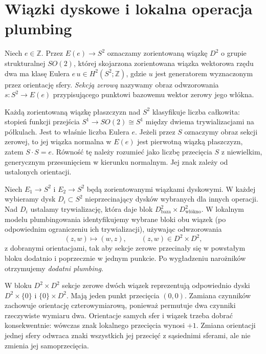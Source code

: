 \section{Wiązki dyskowe i lokalna operacja plumbing}
\label{sec:tg-plumbing-definition}

\begin{definicja}
Niech $e\in\mathbb Z$. Przez $E(e)\to S^2$ oznaczamy zorientowaną
wiązkę $D^2$ o grupie strukturalnej $SO(2)$, której skojarzona
zorientowana wiązka wektorowa rzędu dwa ma klasę Eulera
$e\,u\in H^2(S^2;\mathbb Z)$, gdzie $u$ jest generatorem
wyznaczonym przez orientację sfery. \emph{Sekcją zerową}
nazywamy obraz odwzorowania $s\colon S^2\to E(e)$ przypisującego
punktowi bazowemu wektor zerowy jego włókna.
\end{definicja}

Każdą zorientowaną wiązkę płaszczyzn nad $S^2$ klasyfikuje
liczba całkowita: stopień funkcji przejścia
$S^1\to SO(2)\cong S^1$ między dwiema trywializacjami
na półkulach. Jest to właśnie liczba Eulera $e$.
Jeżeli przez $S$ oznaczymy obraz sekcji zerowej,
to jej wiązka normalna w $E(e)$ jest pierwotną wiązką
płaszczyzn, zatem $S\cdot S=e$. Równość tę należy
rozumieć jako liczbę przecięcia $S$ z niewielkim,
generycznym przesunięciem w kierunku normalnym.
Jej znak zależy od ustalonych orientacji.

\begin{definicja}
Niech $E_1\to S^2$ i $E_2\to S^2$ będą zorientowanymi
wiązkami dyskowymi. W każdej wybieramy dysk $D_i\subset S^2$
nieprzecinający dysków wybranych dla innych operacji.
Nad $D_i$ ustalamy trywializację, która daje blok
$D^2_{\text{baza}}\times D^2_{\text{włókno}}$.
W lokalnym modelu plumbingowania identyfikujemy wybrane
bloki obu wiązek (po odpowiednim ograniczeniu ich
trywializacji), używając odwzorowania
\[
(z,w)\longmapsto(w,z), \qquad (z,w)\in D^2\times D^2,
\]
z dobranymi orientacjami, tak aby sekcje zerowe przecinały się
w powstałym bloku dodatnio i poprzecznie w jednym punkcie.
Po wygładzeniu narożników otrzymujemy \emph{dodatni plumbing}.
\end{definicja}

\begin{uwaga}
W bloku $D^2\times D^2$ sekcje zerowe dwóch wiązek
reprezentują odpowiednio dyski $D^2\times\{0\}$ i
$\{0\}\times D^2$. Mają jeden punkt przecięcia $(0,0)$.
Zamiana czynników zachowuje orientację czterowymiarową,
ponieważ permutuje dwa czynniki rzeczywiste wymiaru dwa.
Orientacje samych sfer i wiązek trzeba dobrać konsekwentnie:
wówczas znak lokalnego przecięcia wynosi $+1$. Zmiana
orientacji jednej sfery odwraca znaki wszystkich jej przecięć
z sąsiednimi sferami, ale nie zmienia jej samoprzecięcia.
\end{uwaga}

